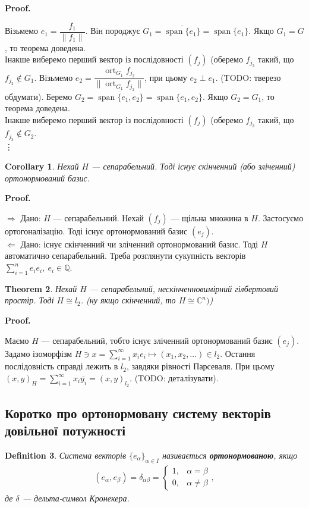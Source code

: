 \documentclass[a4paper, 10pt]{article}
\makeatletter
\def\rightproof{$\boxed{\Rightarrow}$ }
\def\leftproof{$\boxed{\Leftarrow}$ }
\theoremstyle{theoremdd}
\newtheorem{theorem}{Theorem}[subsection]
\theoremstyle{theoremdd}
\newtheorem{definition}[theorem]{Definition}
\theoremstyle{theoremdd}
\theoremstyle{theoremdd}
\theoremstyle{theoremdd}
\theoremstyle{theoremdd}
\theoremstyle{theoremdd}
\theoremstyle{theoremdd}
\newtheorem{corollary}[theorem]{Corollary}
\DeclareMathOperator{\ort}{ort}
\renewenvironment{proof}[1][Proof.\\]{\par
\pushQED{\hfill \qed}%
\normalfont \topsep6\p@\@plus6\p@\relax
\trivlist
\item\relax
{\bfseries
#1\@addpunct{.}}\hspace\labelsep\ignorespaces
}{%
\popQED\endtrivlist\@endpefalse
}
\DeclareMathOperator{\linspan}{span}
\makeatother
\begin{document}
\begin{proof}
Візьмемо $e_1 = \dfrac{f_1}{\|f_1\|}$. Він породжує $G_1 = \overline{\linspan\{e_1\}} = \linspan\{e_1\}$. Якщо $G_1 = G$, то теорема доведена.\\
Інакше виберемо перший вектор із послідовності $(f_j)$ (оберемо $f_{j_2}$ такий, що $f_{j_2} \notin G_1$. Візьмемо $e_2 = \dfrac{\ort_{G_1} f_{j_2}}{\| \ort_{G_1} f_{j_2}\|}$, при цьому $e_2 \perp e_1$. (TODO: тверезо обдумати). Беремо $G_2 = \overline{\linspan\{e_1,e_2\}} = \linspan\{e_1,e_2\}$. Якщо $G_2 = G_1$, то теорема доведена.\\
Інакше виберемо перший вектор із послідовності $(f_j)$ (оберемо $f_{j_3}$ такий, що $f_{j_3} \notin G_2$.\\
\vdots
\end{proof}

\begin{corollary}
Нехай $H$ --- сепарабельний. Тоді існує скінченний (або зліченний) ортонормований базис.
\end{corollary}

\begin{proof}
\rightproof Дано: $H$ --- сепарабельний. Нехай $(f_j)$ --- щільна множина в $H$. Застосуємо ортогоналізацію. Тоді існує ортонормований базис $(e_j)$.
\bigskip \\
\leftproof Дано: існує скінченний чи зліченний ортонормований базис. Тоді $H$ автоматично сепарабельний. Треба розглянути сукупність векторів $\displaystyle\sum_{i=1}^n e_i e_i,\ e_i \in \mathbb{Q}$.
\end{proof}

\begin{theorem}
Нехай $H$ --- сепарабельний, нескінченновимірний гілбертовий простір. Тоді $H \cong l_2$. (ну якщо скінченний, то $H \cong \mathbb{C}^n)$)
\end{theorem}

\begin{proof}
Маємо $H$ --- сепарабельний, тобто існує зліченний ортонормований базис $(e_j)$. Задамо ізоморфізм $H \ni x = \displaystyle\sum_{i=1}^\infty x_i e_i \mapsto (x_1,x_2,\dots) \in l_2$. Остання послідовність справді лежить в $l_2$, завдяки рівності Парсеваля. При цьому $(x,y)_H = \displaystyle\sum_{i=1}^\infty x_i \overline{y_i} = (x,y)_{l_2}$. (TODO: деталізувати).
\end{proof}
\fi

\subsection{Коротко про ортонормовану систему векторів довільної потужності}
\begin{definition}
Система векторів $\{e_\alpha\}_{\alpha \in I}$ називається \textbf{ортонормованою}, якщо
\begin{align*}
(e_\alpha,e_\beta) = \delta_{\alpha \beta} = \begin{cases} 1,& \alpha = \beta \\ 0, & \alpha \neq \beta \end{cases},
\end{align*}
де $\delta$ --- дельта-символ Кронекера.
\end{definition}
\end{document}
